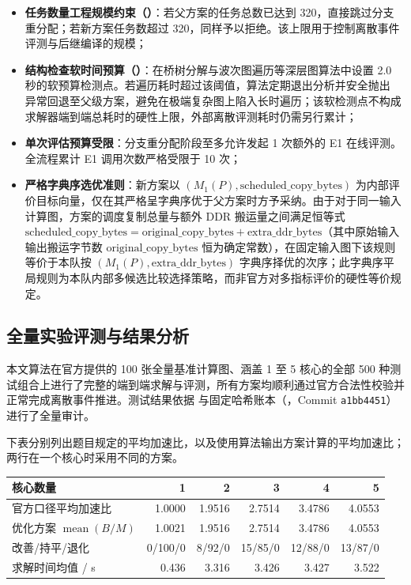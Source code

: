 \documentclass[anonymous,notoc]{gmcm2026}
\providecommand{\tightlist}{\setlength{\itemsep}{0pt}\setlength{\parskip}{0pt}}
\begin{document}
\begin{itemize}
\tightlist
\item
  \textbf{任务数量工程规模约束（\texttt{}）}：若父方案的任务总数已达到 320，直接跳过分支重分配；若新方案任务数超过 320，同样予以拒绝。该上限用于控制离散事件评测与后继编译的规模；
\item
  \textbf{结构检查软时间预算（\texttt{}）}：在桥树分解与波次图遍历等深层图算法中设置 2.0 秒的软预算检测点。若遍历耗时超过该阈值，算法定期退出分析并安全抛出 \texttt{} 异常回退至父级方案，避免在极端复杂图上陷入长时遍历；该软检测点不构成求解器端到端总耗时的硬性上限，外部离散评测耗时仍需另行累计；
\item
  \textbf{单次评估预算受限}：分支重分配阶段至多允许发起 1 次额外的 E1 在线评测。全流程累计 E1 调用次数严格受限于 10 次；
\item
  \textbf{严格字典序选优准则}：新方案以 \((M_1(P), \text{scheduled\_copy\_bytes})\) 为内部评价目标向量，仅在其严格呈字典序优于父方案时方予采纳。由于对于同一输入计算图，方案的调度复制总量与额外 DDR 搬运量之间满足恒等式 \(\text{scheduled\_copy\_bytes} = \text{original\_copy\_bytes} + \text{extra\_ddr\_bytes}\)（其中原始输入输出搬运字节数 \(\text{original\_copy\_bytes}\) 恒为确定常数），在固定输入图下该规则等价于本队按 \((M_1(P), \text{extra\_ddr\_bytes})\) 字典序择优的次序；此字典序平局规则为本队内部多候选比较选择策略，而非官方对多指标评价的硬性等价规定。
\end{itemize}

\subsection{全量实验评测与结果分析}

本文算法在官方提供的 100 张全量基准计算图、涵盖 1 至 5 核心的全部 500 种测试组合上进行了完整的端到端求解与评测，所有方案均顺利通过官方合法性校验并正常完成离散事件推进。测试结果依据 \texttt{} 与固定哈希账本（\texttt{}，Commit \texttt{a1bb4451}）进行了全量审计。

下表分别列出题目规定的平均加速比，以及使用算法输出方案计算的平均加速比；两行在一个核心时采用不同的方案。

\begin{table}[!htbp]\centering\small

\begin{tabularx}{\linewidth}{@{}Xrrrrr@{}}\toprule
核心数量 & 1 & 2 & 3 & 4 & 5 \\
\midrule
官方口径平均加速比 & 1.0000 & 1.9516 & 2.7514 & 3.4786 & 4.0553 \\
优化方案 $\operatorname{mean}(B/M)$ & 1.0021 & 1.9516 & 2.7514 & 3.4786 & 4.0553 \\
改善/持平/退化 & 0/100/0 & 8/92/0 & 15/85/0 & 12/88/0 & 13/87/0 \\
求解时间均值 / s & 0.436 & 3.316 & 3.426 & 3.427 & 3.522 \\
\bottomrule\end{tabularx}\end{table}
\end{document}
